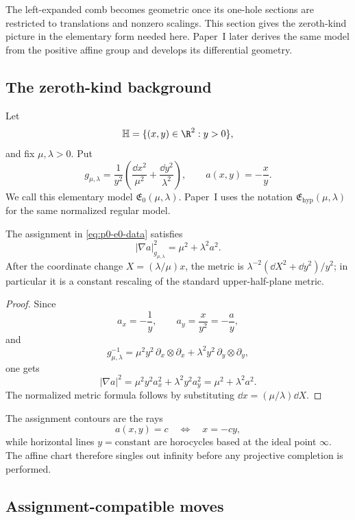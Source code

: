The left-expanded comb becomes geometric once its one-hole sections are
restricted to translations and nonzero scalings.  This section gives the
zeroth-kind picture in the elementary form needed here.  Paper~I later derives
the same model from the positive affine group and develops its differential
geometry.

\subsection{The zeroth-kind background}

Let
\[
  \mathbb H=\{(x,y)\in\R^2:y>0\},
\]
and fix $\mu,\lambda>0$.  Put
\begin{equation}\label{eq:p0-e0-data}
  g_{\mu,\lambda}
  =\frac1{y^2}
   \left(\frac{\dd x^2}{\mu^2}
        +\frac{\dd y^2}{\lambda^2}\right),
  \qquad
  a(x,y)=-\frac{x}{y}.
\end{equation}
We call this elementary model $\mathfrak E_0(\mu,\lambda)$.  Paper~I uses the
notation $\mathfrak E_{\mathrm{hyp}}(\mu,\lambda)$ for the same normalized
regular model.

\begin{proposition}
\label{prop:p0-e0-assignment-law}
The assignment in \eqref{eq:p0-e0-data} satisfies
\[
  |\nabla a|_{g_{\mu,\lambda}}^2
  =\mu^2+\lambda^2a^2.
\]
After the coordinate change $X=(\lambda/\mu)x$, the metric is
$\lambda^{-2}(\dd X^2+\dd y^2)/y^2$; in particular it is a constant rescaling
of the standard upper-half-plane metric.
\end{proposition}

\begin{proof}
Since
\[
  a_x=-\frac1y,
  \qquad
  a_y=\frac{x}{y^2}=-\frac ay,
\]
and
\[
  g_{\mu,\lambda}^{-1}
  =\mu^2y^2\,\partial_x\otimes\partial_x
   +\lambda^2y^2\,\partial_y\otimes\partial_y,
\]
one gets
\[
  |\nabla a|^2
  =\mu^2y^2a_x^2+\lambda^2y^2a_y^2
  =\mu^2+\lambda^2a^2.
\]
The normalized metric formula follows by substituting
$\dd x=(\mu/\lambda)\dd X$.
\end{proof}

The assignment contours are the rays
\[
  a(x,y)=c
  \quad\Longleftrightarrow\quad
  x=-cy,
\]
while horizontal lines $y=\text{constant}$ are horocycles based at the ideal
point $\infty$.  The affine chart therefore singles out infinity before any
projective completion is performed.

\subsection{Assignment-compatible moves}

